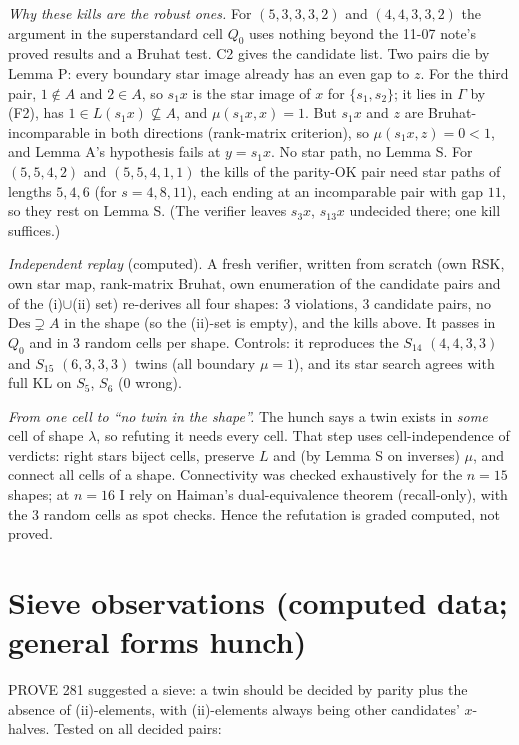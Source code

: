 \documentclass[11pt]{amsart}
\newcommand{\gr}[1]{\textsf{#1}}
\theoremstyle{definition}
\theoremstyle{remark}
\newcommand{\Des}{\mathrm{Des}}
\begin{document}
\emph{Why these kills are the robust ones.} For $(5,3,3,3,2)$ and $(4,4,3,3,2)$ the argument in the superstandard cell $Q_0$ uses nothing beyond the 11-07 note's proved results and a Bruhat test. C2 gives the candidate list. Two pairs die by Lemma P: every boundary star image already has an even gap to $z$. For the third pair, $1\notin A$ and $2\in A$, so $s_1x$ is the star image of $x$ for $\{s_1,s_2\}$; it lies in $\Gamma$ by (F2), has $1\in L(s_1x)\not\subseteq A$, and $\mu(s_1x,x)=1$. But $s_1x$ and $z$ are Bruhat-incomparable in both directions (rank-matrix criterion), so $\mu(s_1x,z)=0<1$, and Lemma A's hypothesis fails at $y=s_1x$. No star path, no Lemma S. For $(5,5,4,2)$ and $(5,5,4,1,1)$ the kills of the parity-OK pair need star paths of lengths $5,4,6$ (for $s=4,8,11$), each ending at an incomparable pair with gap $11$, so they rest on Lemma S. (The verifier leaves $s_3x$, $s_{13}x$ undecided there; one kill suffices.)

\emph{Independent replay} (\gr{computed}). A fresh verifier, written from scratch (own RSK, own star map, rank-matrix Bruhat, own enumeration of the candidate pairs and of the (i)$\cup$(ii) set) re-derives all four shapes: $3$ violations, $3$ candidate pairs, no $\Des\supsetneq A$ in the shape (so the (ii)-set is empty), and the kills above. It passes in $Q_0$ and in $3$ random cells per shape. Controls: it reproduces the $S_{14}$ $(4,4,3,3)$ and $S_{15}$ $(6,3,3,3)$ twins (all boundary $\mu=1$), and its star search agrees with full KL on $S_5$, $S_6$ ($0$ wrong).

\emph{From one cell to ``no twin in the shape''.} The hunch says a twin exists in \emph{some} cell of shape $\lambda$, so refuting it needs every cell. That step uses cell-independence of verdicts: right stars biject cells, preserve $L$ and (by Lemma S on inverses) $\mu$, and connect all cells of a shape. Connectivity was checked exhaustively for the $n=15$ shapes; at $n=16$ I rely on Haiman's dual-equivalence theorem (recall-only), with the $3$ random cells as spot checks. Hence the refutation is graded \gr{computed}, not \gr{proved}.

\section{Sieve observations (\gr{computed} data; general forms \gr{hunch})}

PROVE 281 suggested a sieve: a twin should be decided by parity plus the absence of (ii)-elements, with (ii)-elements always being other candidates' $x$-halves. Tested on all decided pairs:
\end{document}
